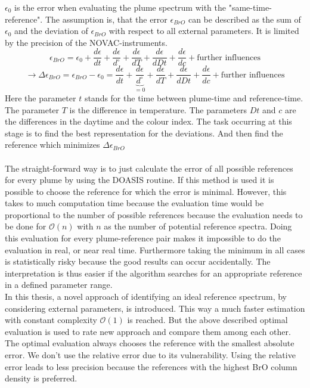 \documentclass  [
  paper    = a4,
  BCOR     = 10mm,
  twoside,
  fontsize = 12pt,
  fleqn,
  toc      = bibnumbered,
  toc      = listofnumbered,
  numbers  = noendperiod,
  headings = normal,
  listof   = leveldown,
  version  = 3.03
]                                       {scrreprt}
\begin{document}
%
$\epsilon_{0}$ is the  error when evaluating the plume spectrum with the "same-time-reference".
The assumption is, that the  error $\epsilon_{BrO}$ can be described as the sum of $\epsilon_{0}$ and the deviation of $\epsilon_{BrO}$ with respect to all external parameters. It is limited by the precision of the NOVAC-instruments.
\begin{equation}
\epsilon_{BrO} =  \epsilon_{0}+\frac{d\epsilon}{dt}+\frac{d\epsilon}{d ^{\circ}}+\frac{d\epsilon}{dT}+\frac{d\epsilon}{dDt} +\frac{d\epsilon}{dc} + \text{further influences} 
\end{equation}
\begin{equation}
\rightarrow \Delta \epsilon_{BrO} =\epsilon_{BrO} - \epsilon_{0} =\frac{d\epsilon}{dt}+\underbrace{\frac{d\epsilon}{d ^{\circ}}}_{=0}+\frac{d\epsilon}{dT}+\frac{d\epsilon}{dDt} +\frac{d\epsilon}{dc} + \text{further influences}
\label{calc:err}
\end{equation}
Here the parameter $t$ stands for the time between plume-time and reference-time. The parameter $T$ is the difference in temperature. The parameters $Dt$ and $c$ are the differences in the daytime and the colour index.
The task occurring at this stage is to find the best representation for the deviations. And then find the reference which minimizes $\Delta \epsilon_{BrO} $\\
%
\\
%
The straight-forward way is to just calculate the  error of all possible references for every plume by using the DOASIS routine. If this method is used it is possible to choose the reference for which the  error is minimal. However, this takes to much computation time because the evaluation time would be proportional to the number of possible references because the evaluation needs to be done for $\mathcal{O}(n)$ with $n$ as the number of potential reference spectra. Doing this evaluation for every plume-reference pair makes it impossible to do the evaluation in real, or near real time.
Furthermore taking the minimum in all cases is statistically risky because the good results can occur accidentally. The interpretation is thus easier if the algorithm searches for an appropriate reference in a defined parameter range.\\
%
In this thesis, a novel approach of identifying an ideal reference spectrum, by considering external parameters, is introduced. This way a much faster estimation with constant complexity $\mathcal{O}(1)$ is reached.
But the above described optimal evaluation is used to rate new approach and compare them among each other. The optimal evaluation always chooses the reference with the smallest absolute error. We don't use the relative error due to its vulnerability. Using the relative error leads to less precision because the references with the highest BrO column density is preferred.\\
\end{document}
